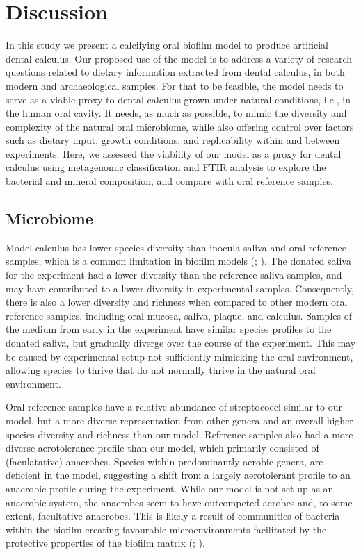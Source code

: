 \documentclass[
  b5paper,
]{book}
\begin{document}
\section{Discussion}\label{discussion}

In this study we present a calcifying oral biofilm model to produce
artificial dental calculus. Our proposed use of the model is to address
a variety of research questions related to dietary information extracted
from dental calculus, in both modern and archaeological samples. For
that to be feasible, the model needs to serve as a viable proxy to
dental calculus grown under natural conditions, i.e., in the human oral
cavity. It needs, as much as possible, to mimic the diversity and
complexity of the natural oral microbiome, while also offering control
over factors such as dietary input, growth conditions, and replicability
within and between experiments. Here, we assessed the viability of our
model as a proxy for dental calculus using metagenomic classification
and FTIR analysis to explore the bacterial and mineral composition, and
compare with oral reference samples.

\subsection{Microbiome}\label{microbiome}

Model calculus has lower species diversity than inocula saliva and oral
reference samples, which is a common limitation in biofilm models
(;
). The donated
saliva for the experiment had a lower diversity than the reference
saliva samples, and may have contributed to a lower diversity in
experimental samples. Consequently, there is also a lower diversity and
richness when compared to other modern oral reference samples, including
oral mucosa, saliva, plaque, and calculus. Samples of the medium from
early in the experiment have similar species profiles to the donated
saliva, but gradually diverge over the course of the experiment. This
may be caused by experimental setup not sufficiently mimicking the oral
environment, allowing species to thrive that do not normally thrive in
the natural oral environment.

Oral reference samples have a relative abundance of streptococci similar
to our model, but a more diverse representation from other genera and an
overall higher species diversity and richness than our model. Reference
samples also had a more diverse aerotolerance profile than our model,
which primarily consisted of (faculatative) anaerobes. Species within
predominantly aerobic genera, are deficient in the model, suggesting a
shift from a largely aerotolerant profile to an anaerobic profile during
the experiment. While our model is not set up as an anaerobic system,
the anaerobes seem to have outcompeted aerobes and, to some extent,
facultative anaerobes. This is likely a result of communities of
bacteria within the biofilm creating favourable microenvironments
facilitated by the protective properties of the biofilm matrix
(;
).
\end{document}
